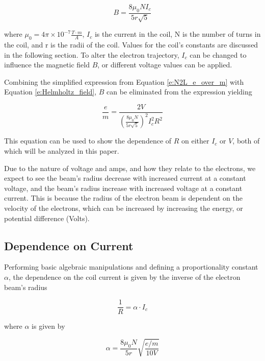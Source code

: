 \documentclass[12pt]{article}
\newcommand{\paren}[1]{\left( {#1} \right)}
\begin{document}
\begin{equation}
	B=\frac{8\mu_0NI_c}{5r\sqrt{5}} \label{e:Helmholtz_field}
\end{equation}

\noindent where $\mu_0=4\pi\times10^{-7} \frac{T\cdot m}{A}$, $I_c$ is the current in the coil, N is the number of turns in the coil, and r is the radii of the coil. Values for the coil's constants are discussed in the following section. To alter the electron trajectory, $I_c$ can be changed to influence the magnetic field $B$, or different voltage values can be applied.

Combining the simplified expression from Equation \ref{e:N2L_e_over_m} with Equation \ref{e:Helmholtz_field}, $B$ can be eliminated from the expression yielding

\begin{equation}
	\frac{e}{m}=\frac{2V}{\paren{\frac{8\mu_0N}{5r\sqrt{5}}}^2I_c^2R^2} \label{e:em_full_expr}
\end{equation}

\noindent This equation can be used to show the dependence of $R$ on either $I_c$ or $V$, both of which will be analyzed in this paper.

Due to the nature of voltage and amps, and how they relate to the electrons, we expect to see the beam's radius decrease with increased current at a constant voltage, and the beam's radius increase with increased voltage at a constant current. This is because the radius of the electron beam is dependent on the velocity of the electrons, which can be increased by increasing the energy, or potential difference (Volts).

\subsection{Dependence on Current}

Performing basic algebraic manipulations and defining a proportionality constant $\alpha$, the dependence on the coil current is given by the inverse of the electron beam's radius

\begin{equation}
	\frac{1}{R}=\alpha\cdot I_c \label{e:FixV_dep}
\end{equation}

\noindent where $\alpha$ is given by

\begin{equation}
	\alpha = \frac{8\mu_0N}{5r}\sqrt{\frac{e/m}{10V}} \label{e:FixV_alpha}
\end{equation}
\end{document}
